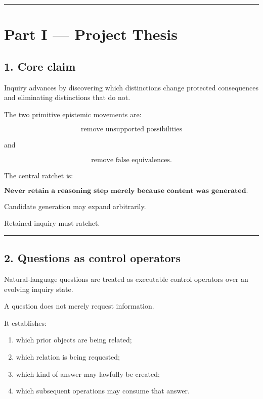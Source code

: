 \documentclass[
]{article}
\providecommand{\tightlist}{%
  \setlength{\itemsep}{0pt}\setlength{\parskip}{0pt}}
\begin{document}
\begin{center}\rule{0.5\linewidth}{0.5pt}\end{center}

\section{Part I --- Project Thesis}\label{part-i-project-thesis}

\subsection{1. Core claim}\label{core-claim}

Inquiry advances by discovering which distinctions change protected
consequences and eliminating distinctions that do not.

The two primitive epistemic movements are:

\[
\boxed{
\text{remove unsupported possibilities}
}
\]

and

\[
\boxed{
\text{remove false equivalences}.
}
\]

The central ratchet is:

\[
\boxed{
\textbf{Never retain a reasoning step merely because content was generated.
Retain it only if it produces a warranted consequential change.}
}
\]

Candidate generation may expand arbitrarily.

Retained inquiry must ratchet.

\begin{center}\rule{0.5\linewidth}{0.5pt}\end{center}

\subsection{2. Questions as control
operators}\label{questions-as-control-operators}

Natural-language questions are treated as executable control operators
over an evolving inquiry state.

A question does not merely request information.

It establishes:

\begin{enumerate}
\def\labelenumi{\arabic{enumi}.}
\tightlist
\item
  which prior objects are being related;
\item
  which relation is being requested;
\item
  which kind of answer may lawfully be created;
\item
  which subsequent operations may consume that answer.
\end{enumerate}
\end{document}
